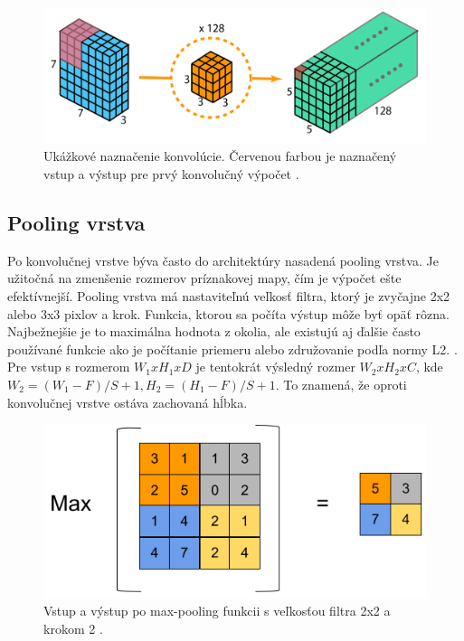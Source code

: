 \begin{figure}[ht]
    \centering
    \includegraphics[width=.7\textwidth]{images/02/filters2.png}
    \caption{Ukážkové naznačenie konvolúcie. Červenou farbou je naznačený vstup a výstup pre prvý konvolučný výpočet \cite{filters}. }
    \label{img:conv}
\end{figure}

\subsection{Pooling vrstva}

Po konvolučnej vrstve býva často do architektúry nasadená pooling vrstva. Je užitočná na zmenšenie rozmerov príznakovej mapy, čím je výpočet ešte efektívnejší. Pooling vrstva má nastaviteľnú veľkosť filtra, ktorý je zvyčajne 2x2 alebo 3x3 pixlov a krok. Funkcia, ktorou sa počíta výstup môže byť opäť rôzna. Najbežnejšie je to maximálna hodnota z okolia, ale existujú aj ďalšie často používané funkcie ako je počítanie priemeru alebo združovanie podľa normy L2. \cite{cnn-intro}. Pre vstup s rozmerom \begin{math}W_1xH_1xD\end{math} je tentokrát výsledný rozmer \begin{math}W_2xH_2xC\end{math}, kde \begin{math}W_2 = (W_1 - F)/S + 1, H_2 = (H_1 - F)/S + 1\end{math}. To znamená, že oproti konvolučnej vrstve ostáva zachovaná hĺbka.

\begin{figure}[ht]
    \centering
    \includegraphics[width=.5\textwidth]{images/02/pooling.png}
    \caption{Vstup a výstup po max-pooling funkcii s veľkosťou filtra 2x2 a krokom 2 \cite{pool}.}
    \label{img:maxpool}
\end{figure}

